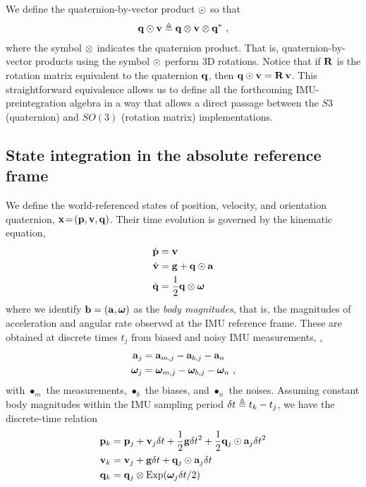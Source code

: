 We define the quaternion-by-vector product $\odot$ so that
%
\begin{align}
{\bf q}\odot{\bf v} \triangleq {\bf q}\otimes{\bf v}\otimes{\bf q}^*
~,
\end{align}
%
where the symbol $\otimes$ indicates the quaternion product.
That is, quaternion-by-vector products using the symbol $\odot$ perform 3D rotations. 
Notice that if ${\bf R}$ is the rotation matrix equivalent to the quaternion ${\bf q}$, then 
%
${\bf q}\odot{\bf v} = {\bf R}\,{\bf v}$. 
%
This straightforward equivalence
allows us to define all the forthcoming IMU-preintegration algebra in a way that allows a direct passage between the $S3$ (quaternion) and $SO(3)$ (rotation matrix) implementations.





\subsection{State integration in the absolute reference frame}

We define the world-referenced states of position, velocity, and orientation quaternion, ${\bf x}\!=\!({\bf p},{\bf v},{\bf q})$. 
Their time evolution is governed by the kinematic equation,
%
\begin{align}\label{equ:cont_basic}
\begin{split}
\dot{{\bf p}} &= {\bf v} \\
\dot{{\bf v}} &= {\bf g} + {\bf q}\odot{\bf a} \\
\dot{{\bf q}} &= \frac12{\bf q}\otimes{{\bm \omega}} 
\end{split}
\end{align}
%
where we identify ${\bf b}=({\bf a},{{\bm \omega}})$ as the \emph{body magnitudes}, that is, the magnitudes of acceleration and angular rate observed at the IMU reference frame. These are obtained at discrete times $t_j$ from biased and noisy IMU measurements, \ie,
%
\begin{align}\label{equ:body}
\begin{split}
{\bf a}_j &= {\bf a}_{m,j} - {\bf a}_{b,j} - {\bf a}_n \\
{{\bm \omega}}_j  &= {{\bm \omega}}_{m,j}  - {{\bm \omega}}_{b,j}  - {{\bm \omega}}_n 
~,
\end{split}
\end{align}
%
with $\bullet_m$ the measurements, $\bullet_b$ the biases, and $\bullet_n$ the noises.
Assuming constant body magnitudes within the IMU sampling period $\delta t\triangleq t_k-t_j$, we have the discrete-time relation
%
\begin{align}\label{equ:integration_state}
\begin{split}
{\bf p}_{k} &= {\bf p}_j + {\bf v}_j\delta t  + \frac12{\bf g}\delta t^2 + \frac12{\bf q}_j\odot{\bf a}_j\delta t^2 \\
{\bf v}_{k} &= {\bf v}_j + {\bf g}\delta t + {\bf q}_j\odot{\bf a}_j\delta t \\
{\bf q}_{k} &= {\bf q}_j\otimes\operatorname*{Exp}({{\bm \omega}}_j\delta t/2) 
\end{split}
\end{align}


